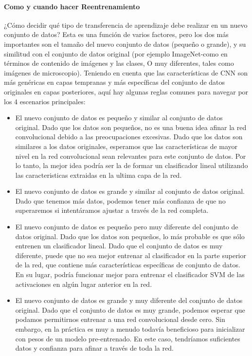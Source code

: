 \documentclass[a4paper,12pt,spanish]{book}
\begin{document}
      \paragraph{Como y cuando hacer Reentrenamiento}
	¿Cómo decidir qué tipo de transferencia de aprendizaje debe realizar en un nuevo conjunto de datos? Esta es una función de varios factores, pero los dos más importantes son el 
	tamaño del nuevo conjunto de datos (pequeño o grande), y su similitud con el conjunto de datos original (por ejemplo ImageNet-como en términos de contenido de imágenes y las clases,
	O muy diferentes, tales como imágenes de microscopio). Teniendo en cuenta que las características de CNN son más genéricas en capas tempranas y más específicas del conjunto de datos
	originales en capas posteriores, aquí hay algunas reglas comunes para navegar por los 4 escenarios principales:
	\begin{itemize}
	  \item El nuevo conjunto de datos es pequeño y similar al conjunto de datos original. Dado que los datos son pequeños, no es una buena idea afinar la red convolucional debido a las 
	  preocupaciones excesivas. Dado que los datos son similares a los datos originales, esperamos que las características de mayor nivel en la red convolucional sean relevantes para este
	  conjunto de datos. Por lo tanto, la mejor idea podría ser la de formar un clasificador lineal utilizando las caracteristicas extraidas en la ultima capa de la red.
	  \item El nuevo conjunto de datos es grande y similar al conjunto de datos original. Dado que tenemos más datos, podemos tener más confianza de que no superaremos si intentáramos 
	  ajustar a través de la red completa.
	  \item El nuevo conjunto de datos es pequeño pero muy diferente del conjunto de datos original. Dado que los datos son pequeños, lo más probable es que sólo entrenen un clasificador 
	  lineal. Dado que el conjunto de datos es muy diferente, puede que no sea mejor entrenar al clasificador en la parte superior de la red, que contiene más características específicas
	  de conjunto de datos. En su lugar, podría funcionar mejor para entrenar el clasificador SVM de las activaciones en algún lugar anterior en la red.
	  \item El nuevo conjunto de datos es grande y muy diferente del conjunto de datos original. Dado que el conjunto de datos es muy grande, podemos esperar que podamos permitirnos 
	  entrenar a una red convolucional desde cero. Sin embargo, en la práctica es muy a menudo todavía beneficioso para inicializar con pesos de un modelo pre-entrenado. 
	  En este caso, tendríamos suficientes datos y confianza para afinar a través de toda la red.
	\end{itemize}
\end{document}
